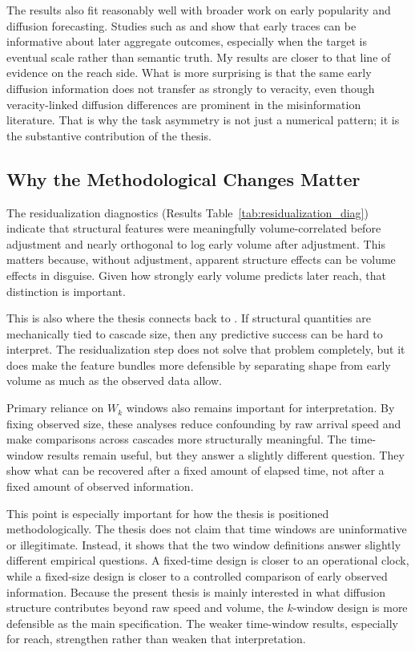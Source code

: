 The results also fit reasonably well with broader work on early popularity and diffusion forecasting. Studies such as \citet{szabo_predicting_2010} and \citet{cheng_can_2014} show that early traces can be informative about later aggregate outcomes, especially when the target is eventual scale rather than semantic truth. My results are closer to that line of evidence on the reach side. What is more surprising is that the same early diffusion information does not transfer as strongly to veracity, even though veracity-linked diffusion differences are prominent in the misinformation literature. That is why the task asymmetry is not just a numerical pattern; it is the substantive contribution of the thesis.

\subsection{Why the Methodological Changes Matter}
The residualization diagnostics (Results Table~\ref{tab:residualization_diag}) indicate that structural features were meaningfully volume-correlated before adjustment and nearly orthogonal to log early volume after adjustment. This matters because, without adjustment, apparent structure effects can be volume effects in disguise. Given how strongly early volume predicts later reach, that distinction is important.

This is also where the thesis connects back to \citet{goel_structural_2016}. If structural quantities are mechanically tied to cascade size, then any predictive success can be hard to interpret. The residualization step does not solve that problem completely, but it does make the feature bundles more defensible by separating shape from early volume as much as the observed data allow.

Primary reliance on $W_k$ windows also remains important for interpretation. By fixing observed size, these analyses reduce confounding by raw arrival speed and make comparisons across cascades more structurally meaningful. The time-window results remain useful, but they answer a slightly different question. They show what can be recovered after a fixed amount of elapsed time, not after a fixed amount of observed information.

This point is especially important for how the thesis is positioned methodologically. The thesis does not claim that time windows are uninformative or illegitimate. Instead, it shows that the two window definitions answer slightly different empirical questions. A fixed-time design is closer to an operational clock, while a fixed-size design is closer to a controlled comparison of early observed information. Because the present thesis is mainly interested in what diffusion structure contributes beyond raw speed and volume, the $k$-window design is more defensible as the main specification. The weaker time-window results, especially for reach, strengthen rather than weaken that interpretation.

